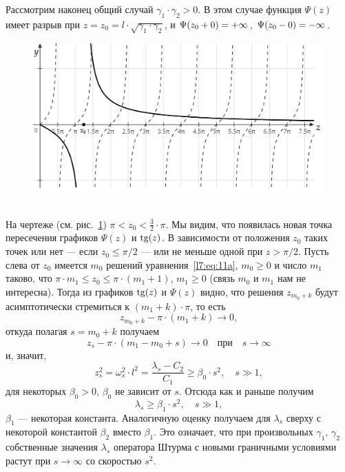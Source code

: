Рассмотрим наконец общий случай $\gamma_1\cdot\gamma_2>0$. В этом случае функция $\Psi(z)$ имеет разрыв при $z=z_0=l\cdot\sqrt{\gamma_1\cdot\gamma_2}$, и $\Psi(z_0+0)\?=+\infty$, $\Psi(z_0-0)\?=-\infty$.
\begin{figure}[H]\centering
	\includegraphics[width=0.7\linewidth]{picture2}
	\caption{~}
\label{l7:fig:2}
\end{figure}
На чертеже (см. рис.~\ref{l7:fig:2}) $\pi<z_0<\frac{3}{2}\cdot\pi$. Мы видим, что появилась новая точка пересечения графиков $\Psi(z)$ и $\operatorname{tg}(z)$. В зависимости от положения $z_0$ таких точек или нет --- если $z_0\leqslant{\pi}/{2}$ --- или не меньше одной при $z>{\pi}/{2}$. Пусть слева от $z_0$ имеется $m_0$ решений уравнения~\eqref{l7:eq:11a}, $m_0\geqslant0$ и число $m_1$ таково, что $\pi\cdot m_1\leqslant z_0\leqslant\pi\cdot(m_1+1)$, $m_1\geqslant0$ (связь $m_0$ и $m_1$ нам не интересна). Тогда из графиков $\operatorname{tg}(z)$ и $\Psi(z)$ видно, что решения $z_{m_0+k}$ будут асимптотически стремиться к $(m_1+k)\cdot\pi$, то есть
\begin{equation*}
	\displaystyle z_{m_0+k}-\pi\cdot(m_1+k)\to0,
\end{equation*}
откуда полагая $s=m_0+k$ получаем 
\begin{equation*}
	 z_s-\pi\cdot(m_1-m_0+s)\to0\quad\text{при}\quad s\to\infty
\end{equation*}
и, значит, 
\begin{equation*}
	 z_s^2=\omega_s^2\cdot l^2=\dfrac{\lambda_s-C_2}{C_1}\geqslant\beta_0\cdot s^2,\quad s\gg1,
\end{equation*} 
для некоторых $\beta_0>0$, $\beta_0$ не зависит от $s$. Отсюда как и раньше получим
\begin{equation*}
	\lambda_s\geqslant\beta_1\cdot s^2,\quad s\gg1,
\end{equation*} 
$\beta_1$ --- некоторая константа. Аналогичную оценку получаем для $\lambda_s$ сверху с некоторой константой $\beta_2$ вместо $\beta_1$. Это означает, что при произвольных $\gamma_1,\,\gamma_2$ собственные значения $\lambda_s$ оператора Штурма с новыми граничными условиями растут при $s\to\infty$ со скоростью $s^2$.
\vspace{0.2cm}

